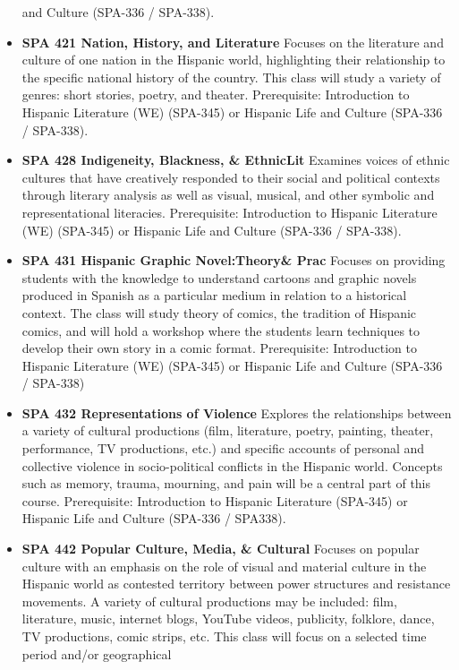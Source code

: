 \documentclass[
  letterpaper,
]{scrbook}
\begin{document}
\begin{itemize}
  and Culture (SPA-336 / SPA-338).
\item
  \textbf{SPA 421 Nation, History, and Literature} Focuses on the
  literature and culture of one nation in the Hispanic world,
  highlighting their relationship to the specific national history of
  the country. This class will study a variety of genres: short stories,
  poetry, and theater. Prerequisite: Introduction to Hispanic Literature
  (WE) (SPA-345) or Hispanic Life and Culture (SPA-336 / SPA-338).
\item
  \textbf{SPA 428 Indigeneity, Blackness, \& EthnicLit} Examines voices
  of ethnic cultures that have creatively responded to their social and
  political contexts through literary analysis as well as visual,
  musical, and other symbolic and representational literacies.
  Prerequisite: Introduction to Hispanic Literature (WE) (SPA-345) or
  Hispanic Life and Culture (SPA-336 / SPA-338).
\item
  \textbf{SPA 431 Hispanic Graphic Novel:Theory\& Prac} Focuses on
  providing students with the knowledge to understand cartoons and
  graphic novels produced in Spanish as a particular medium in relation
  to a historical context. The class will study theory of comics, the
  tradition of Hispanic comics, and will hold a workshop where the
  students learn techniques to develop their own story in a comic
  format. Prerequisite: Introduction to Hispanic Literature (WE)
  (SPA-345) or Hispanic Life and Culture (SPA-336 / SPA-338)
\item
  \textbf{SPA 432 Representations of Violence} Explores the
  relationships between a variety of cultural productions (film,
  literature, poetry, painting, theater, performance, TV productions,
  etc.) and specific accounts of personal and collective violence in
  socio-political conflicts in the Hispanic world. Concepts such as
  memory, trauma, mourning, and pain will be a central part of this
  course. Prerequisite: Introduction to Hispanic Literature (SPA-345) or
  Hispanic Life and Culture (SPA-336 / SPA338).
\item
  \textbf{SPA 442 Popular Culture, Media, \& Cultural} Focuses on
  popular culture with an emphasis on the role of visual and material
  culture in the Hispanic world as contested territory between power
  structures and resistance movements. A variety of cultural productions
  may be included: film, literature, music, internet blogs, YouTube
  videos, publicity, folklore, dance, TV productions, comic strips, etc.
  This class will focus on a selected time period and/or geographical

\end{itemize}
\end{document}
